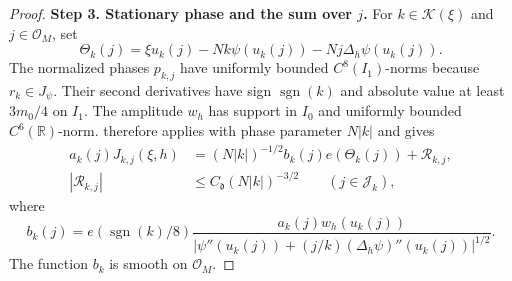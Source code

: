 \documentclass[reqno,12pt]{amsart}
\def \R {\mathbb R}
\numberwithin{equation}{section}
\begin{document}
\begin{proof}
\medskip
\noindent\textbf{Step 3. Stationary phase and the sum over $j$.}
For $k\in\mathcal K(\xi)$ and $j\in\mathcal O_M$, set
\begin{equation}
 \Theta_k(j)=\xi u_k(j)-Nk\psi(u_k(j))
                    -Nj\Delta_h\psi(u_k(j)).
 \label{eq3-add-action}
\end{equation}
The normalized phases $p_{k,j}$ have uniformly bounded $C^8(I_1)$-norms because $r_k\in J_\psi$. Their second derivatives have sign
$\operatorname{sgn}(k)$ and absolute value at least $3m_0/4$ on
$I_1$. The amplitude $w_h$ has support in $I_0$
and uniformly bounded $C^6(\R)$-norm. 
therefore applies with phase parameter $N|k|$ and gives
\begin{equation}
 \begin{split}
 a_k(j)J_{k,j}(\xi,h)
 &=(N|k|)^{-1/2}b_k(j)e(\Theta_k(j))+\mathcal R_{k,j},\\
 |\mathcal R_{k,j}|&\le C_{\mathfrak d}(N|k|)^{-3/2}
                         \qquad(j\in\mathcal J_k),
 \end{split}
 \label{eq3-add-mode-stationary}
\end{equation}
where
\begin{equation}
 b_k(j)=e(\operatorname{sgn}(k)/8)
 \frac{a_k(j)w_h(u_k(j))}
 {\bigl|\psi''(u_k(j))+(j/k)(\Delta_h\psi)''(u_k(j))\bigr|^{1/2}}.
 \label{eq3-add-stationary-amplitude}
\end{equation}
The function $b_k$ is smooth on $\mathcal O_M$. 


\end{proof}
\end{document}

